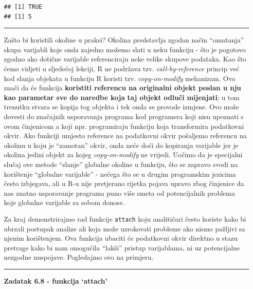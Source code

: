 \documentclass[]{book}
\theoremstyle{definition}
\theoremstyle{definition}
\theoremstyle{definition}
\theoremstyle{remark}
\begin{document}
\begin{verbatim}
## [1] TRUE
## [1] 5
\end{verbatim}

\begin{center}\rule{0.5\linewidth}{\linethickness}\end{center}

Zašto bi koristili okoline u praksi? Okolina predstavlja zgodan način
``omatanja'' skupa varijabli koje onda zajedno možemo slati u neku
funkciju - što je pogotovo zgodno ako dotične varijable referenciraju
neke velike skupove podataka. Kao što ćemo vidjeti u sljedećoj lekciji,
R ne podržava tzv. \emph{call-by-reference} princip već kod slanja
objekata u funkciju R koristi tzv. \emph{copy-on-modify} mehanizam. Ovo
znači da će funkcija \textbf{koristiti referencu na originalni objekt
poslan u nju kao parametar sve do naredbe koja taj objekt odluči
mijenjati}; u tom trenutku stvara se kopija tog objekta i tek onda se
provode izmjene. Ovo može dovesti do značajnih usporavanja programa kod
programera koji nisu upoznati s ovom činjenicom a koji npr. programiraju
funkciju koja transformira podatkovni okvir. Ako funkciji umjesto
reference na podatkovni okvir pošaljemo referencu na okolinu u koju je
``zamotan'' okvir, onda neće doći do kopiranja varijable jer je okolina
jedini objekt za kojeg \emph{copy-on-modify} ne vrijedi. Uočimo da je
specijalni slučaj ove metode ``slanje'' globalne okoline u funkciju, što
se zapravo svodi na korištenje ``globalne varijable'' - nečega što se u
drugim programskim jezicima često izbjegava, ali u R-u nije pretjerano
rijetka pojava upravo zbog činjenice da nas znatno usporavanje programa
puno više smeta od potencijalnih problema koje globalne varijable sa
sobom donose.

Za kraj demonstrirajmo rad funkcije \texttt{attach} koju analitičari
često koriste kako bi ubrzali postupak analize ali koja može uzrokovati
probleme ako nismo pažljivi sa njenim korištenjem. Ova funkcija ubaciti
će podatkovni okvir direktno u stazu pretrage kako bi nam omogućila
``lakši'' pristup varijablama, ni uz potencijalne nezgodne nuspojave.
Pogledajmo ovo na primjeru.

\begin{center}\rule{0.5\linewidth}{\linethickness}\end{center}

\textbf{Zadatak 6.8 - funkcija `attach'}
\end{document}
